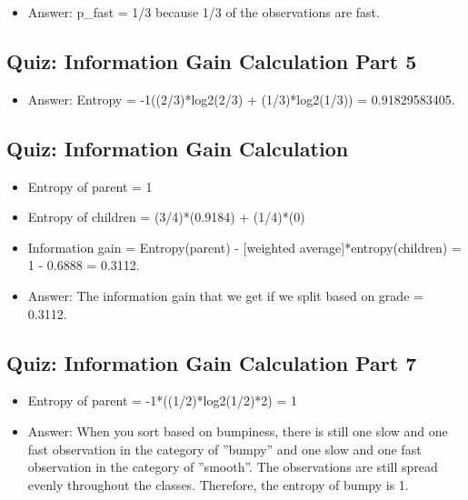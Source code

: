 \documentclass[12pt]{report}
\begin{document}
\begin{itemize}

\item Answer: p\_fast = 1/3 because 1/3 of the observations are fast.  

\end{itemize}

\subsection{Quiz: Information Gain Calculation Part 5}

\begin{itemize}

\item Answer: Entropy = -1((2/3)*log2(2/3) + (1/3)*log2(1/3)) = 0.91829583405. 

\end{itemize}

\subsection{Quiz: Information Gain Calculation}

\begin{itemize}

\item Entropy of parent = 1

\item Entropy of children = (3/4)*(0.9184) + (1/4)*(0)

\item Information gain = Entropy(parent) - [weighted average]*entropy(children) = 1 - 0.6888 = 0.3112.

\item Answer: The information gain that we get if we split based on grade = 0.3112. 

\end{itemize}

\subsection{Quiz: Information Gain Calculation Part 7}

\begin{itemize}

\item Entropy of parent = -1*((1/2)*log2(1/2)*2) = 1

\item Answer: When you sort based on bumpiness, there is still one slow and one fast observation in the category of ''bumpy'' and one slow and one fast observation in the category of ''smooth''. The observations are still spread evenly throughout the classes. Therefore, the entropy of bumpy is 1. 

\end{itemize}
\end{document}
